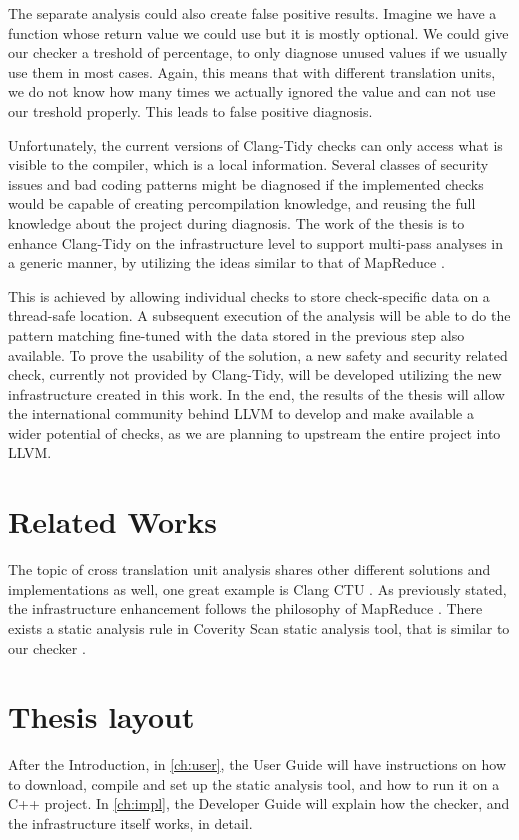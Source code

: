 The separate analysis could also create false positive results. Imagine we have a function whose return value we could use but it is mostly
optional. We could give our checker a treshold of percentage, to only diagnose unused values if we usually use them in most cases. Again, this
means that with different translation units, we do not know how many times we actually ignored the value and can not use our treshold properly.
This leads to false positive diagnosis.

Unfortunately, the current versions of Clang-Tidy checks can only access what is visible to the compiler, which is a local information.
Several classes of security issues and bad coding patterns might be diagnosed if the implemented checks would be capable of creating 
percompilation knowledge, and reusing the full knowledge about the project during diagnosis.
The work of the thesis is to enhance Clang-Tidy on the infrastructure level to support multi-pass analyses in a generic manner, by 
utilizing the ideas similar to that of MapReduce \cite{mapreduce}.

This is achieved by allowing individual checks to store check-specific data on a thread-safe location.
A subsequent execution of the analysis will be able to do the pattern matching fine-tuned with the data stored in the previous step also
available.
To prove the usability of the solution, a new safety and security related check, currently not provided by Clang-Tidy, will be developed
utilizing the new infrastructure created in this work.
In the end, the results of the thesis will allow the international community behind LLVM to develop and make available a wider potential of
checks, as we are planning to upstream the entire project into LLVM. \cite{upstream1} \cite{upstream2} \cite{upstream3}

\section{Related Works}

The topic of cross translation unit analysis shares other different solutions and implementations as well, one great example is
Clang CTU \cite{clangCTU}.
As previously stated, the infrastructure enhancement follows the philosophy of MapReduce \cite{mapreduce}.
There exists a static analysis rule in Coverity Scan static analysis tool, that is similar to our checker \cite{coverity}.


\section{Thesis layout}

After the Introduction, in \cref{ch:user}, the User Guide will have instructions on how to download, compile and set up the static analysis tool, and
how to run it on a C++ project. In \cref{ch:impl}, the Developer Guide will explain how the checker, and the infrastructure itself works, in detail.
